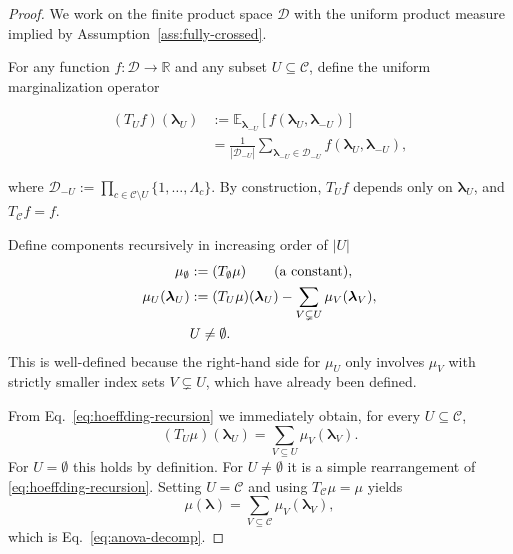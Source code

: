 \begin{proof}
    \label{prf:anova-expectation}
We work on the finite product space $\mathcal{D}$ with the uniform product
measure implied by Assumption~\ref{ass:fully-crossed}.

For any function $f:\mathcal{D}\to\mathbb{R}$ and any subset
$U\subseteq\mathcal{C}$, define the uniform marginalization operator

{\small
\begin{align}
\label{eq:TU-def}
(T_U f)(\boldsymbol{\lambda}_U)
&:=
\mathbb{E}_{\boldsymbol{\lambda}_{-U}}\!\left[
f(\boldsymbol{\lambda}_U,\boldsymbol{\lambda}_{-U})
\right]\\
&=
\frac{1}{|\mathcal{D}_{-U}|}
\sum_{\boldsymbol{\lambda}_{-U}\in\mathcal{D}_{-U}}
f(\boldsymbol{\lambda}_U,\boldsymbol{\lambda}_{-U}),
\end{align}
}

where $\mathcal{D}_{-U}:=\prod_{c\in\mathcal{C}\setminus U}\{1,\dots,\Lambda_c\}$.
By construction, $T_U f$ depends only on $\boldsymbol{\lambda}_U$, and
$T_{\mathcal{C}} f=f$.


Define components recursively in increasing order of $|U|$
\begin{align}
\label{eq:hoeffding-recursion}
\mu_\emptyset
&:= (T_\emptyset \mu)
\qquad\text{(a constant)},\\
\mu_U(\boldsymbol{\lambda}_U)
&:=
(T_U \mu)(\boldsymbol{\lambda}_U)
-
\sum_{V\subsetneq U}
\mu_V(\boldsymbol{\lambda}_V),\\ 
&U\neq\emptyset.
\notag
\end{align}
This is well-defined because the right-hand side for $\mu_U$ only involves
$\mu_V$ with strictly smaller index sets $V\subsetneq U$, which have already
been defined.

From Eq.~\eqref{eq:hoeffding-recursion} we immediately obtain, for every
$U\subseteq\mathcal{C}$,
\begin{equation}
\label{eq:TU-sum-identity}
(T_U \mu)(\boldsymbol{\lambda}_U)
=
\sum_{V\subseteq U}\mu_V(\boldsymbol{\lambda}_V).
\end{equation}
For $U=\emptyset$ this holds by definition. 
For $U\neq\emptyset$ it is a simple
rearrangement of \eqref{eq:hoeffding-recursion}.
Setting $U=\mathcal{C}$ and using $T_{\mathcal{C}}\mu=\mu$ yields
\[
\mu(\boldsymbol{\lambda})
=
\sum_{V\subseteq\mathcal{C}}\mu_V(\boldsymbol{\lambda}_V),
\]
which is Eq.~\eqref{eq:anova-decomp}.


\end{proof}
